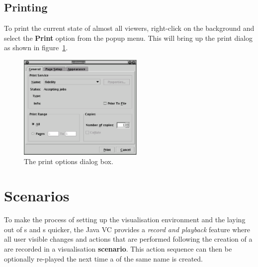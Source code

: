 \subsection{Printing}

To print the current state of almost all viewers, right-click on the
background and select the \textbf{Print} option from the popup menu.
This will bring up the print dialog as shown in
figure~\ref{fig:printdialog}.

\begin{figure}[htsp]
\centering
\includegraphics[width=6cm]{vcprintdialog}
\caption{The print options dialog box.}
\label{fig:printdialog}
\end{figure}


\section{Scenarios}
\label{sec:scenarios}

To make the process of setting up the visualisation environment and
the laying out of \viewer{}s and \viewlet{}s quicker, the Java VC
provides a \emph{record and playback} feature where all user visible
changes and actions that are performed following the creation of a
\viewable{} are recorded in a visualisation \textbf{scenario}.  This
action sequence can then be optionally re-played the next time a
\viewable{} of the same name is created.

